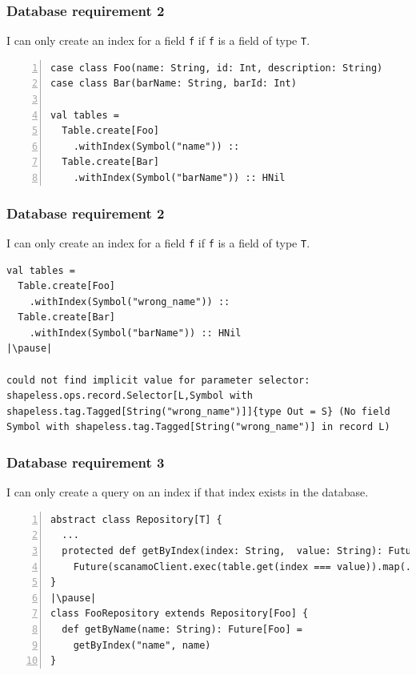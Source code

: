 \documentclass[aspectratio=169]{beamer}
\begin{document}
\begin{frame}[fragile]
\frametitle{Database requirement 2}
I can only create an index for a field \texttt{f} if \texttt{f} is a field of type \texttt{T}.
\hfill \break
\begin{lstlisting}[style=myScalaStyle,frame=none,escapeinside=||,numbers=left]
case class Foo(name: String, id: Int, description: String)
case class Bar(barName: String, barId: Int)

val tables =
  Table.create[Foo]
    .withIndex(Symbol("name")) ::
  Table.create[Bar]
    .withIndex(Symbol("barName")) :: HNil

\end{lstlisting}

\end{frame}


\begin{frame}[fragile]
\frametitle{Database requirement 2}
I can only create an index for a field \texttt{f} if \texttt{f} is a field of type \texttt{T}.
\hfill \break
\begin{lstlisting}[style=myScalaStyle,frame=none,escapeinside=||]
val tables =
  Table.create[Foo]
    .withIndex(Symbol("wrong_name")) ::
  Table.create[Bar]
    .withIndex(Symbol("barName")) :: HNil
|\pause|

could not find implicit value for parameter selector: shapeless.ops.record.Selector[L,Symbol with shapeless.tag.Tagged[String("wrong_name")]]{type Out = S} (No field Symbol with shapeless.tag.Tagged[String("wrong_name")] in record L)
\end{lstlisting}
\end{frame}

\begin{frame}[fragile]
\frametitle{Database requirement 3}
I can only create a query on an index if that index exists in the database.
\hfill \break
\begin{lstlisting}[style=myScalaStyle,frame=none,escapeinside=||,numbers=left]
abstract class Repository[T] {
  ...
  protected def getByIndex(index: String,  value: String): Future[T] =
    Future(scanamoClient.exec(table.get(index === value)).map(...)
}
|\pause|
class FooRepository extends Repository[Foo] {
  def getByName(name: String): Future[Foo] =
    getByIndex("name", name)
}

\end{lstlisting}
\end{frame}
\end{document}
